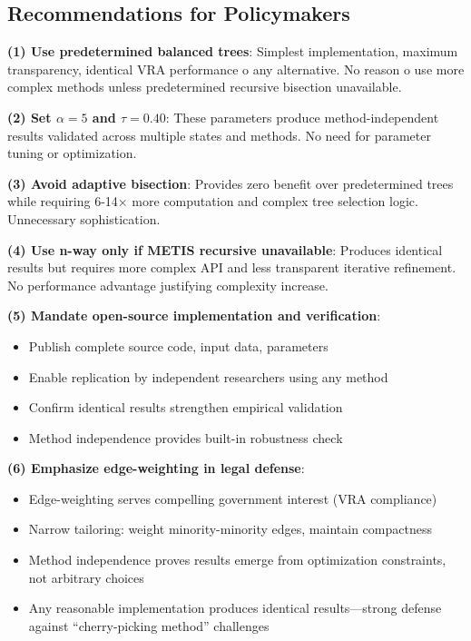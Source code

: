 \subsection{Recommendations for Policymakers}

\textbf{(1) Use predetermined balanced trees}: Simplest implementation, maximum transparency, identical VRA performance 	o any alternative. No reason 	o use more complex methods unless predetermined recursive bisection unavailable.

\textbf{(2) Set $\alpha = 5$ and $\tau = 0.40$}: These parameters produce method-independent results validated across multiple states and methods. No need for parameter tuning or optimization.

\textbf{(3) Avoid adaptive bisection}: Provides zero benefit over predetermined trees while requiring 6-14× more computation and complex tree selection logic. Unnecessary sophistication.

\textbf{(4) Use n-way only if METIS recursive unavailable}: Produces identical results but requires more complex API and less transparent iterative refinement. No performance advantage justifying complexity increase.

\textbf{(5) Mandate open-source implementation and verification}:
\begin{itemize}
\item Publish complete source code, input data, parameters
\item Enable replication by independent researchers using any method
\item Confirm identical results strengthen empirical validation
\item Method independence provides built-in robustness check
\end{itemize}

\textbf{(6) Emphasize edge-weighting in legal defense}:
\begin{itemize}
\item Edge-weighting serves compelling government interest (VRA compliance)
\item Narrow tailoring: weight minority-minority edges, maintain compactness
\item Method independence proves results emerge from optimization constraints, not arbitrary choices
\item Any reasonable implementation produces identical results—strong defense against ``cherry-picking method'' challenges
\end{itemize}

